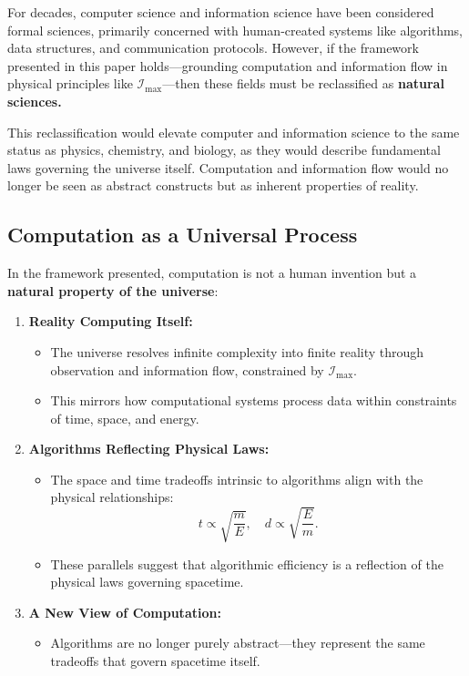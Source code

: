 \documentclass[12pt]{article}
\begin{document}
For decades, computer science and information science have been considered formal sciences, primarily concerned with human-created systems like algorithms, data structures, and communication protocols. However, if the framework presented in this paper holds—grounding computation and information flow in physical principles like $\mathcal{I}_{\text{max}}$—then these fields must be reclassified as \textbf{natural sciences.}

This reclassification would elevate computer and information science to the same status as physics, chemistry, and biology, as they would describe fundamental laws governing the universe itself. Computation and information flow would no longer be seen as abstract constructs but as inherent properties of reality.

\subsection{Computation as a Universal Process}

In the framework presented, computation is not a human invention but a \textbf{natural property of the universe}:
\begin{enumerate}
    \item \textbf{Reality Computing Itself:}
    \begin{itemize}
        \item The universe resolves infinite complexity into finite reality through observation and information flow, constrained by $\mathcal{I}_{\text{max}}$.
        \item This mirrors how computational systems process data within constraints of time, space, and energy.
    \end{itemize}

    \item \textbf{Algorithms Reflecting Physical Laws:}
    \begin{itemize}
        \item The space and time tradeoffs intrinsic to algorithms align with the physical relationships:
        \[
        t \propto \sqrt{\frac{m}{E}}, \quad d \propto \sqrt{\frac{E}{m}}.
        \]
        \item These parallels suggest that algorithmic efficiency is a reflection of the physical laws governing spacetime.
    \end{itemize}

    \item \textbf{A New View of Computation:}
    \begin{itemize}
        \item Algorithms are no longer purely abstract—they represent the same tradeoffs that govern spacetime itself.
    \end{itemize}
\end{enumerate}
\end{document}
